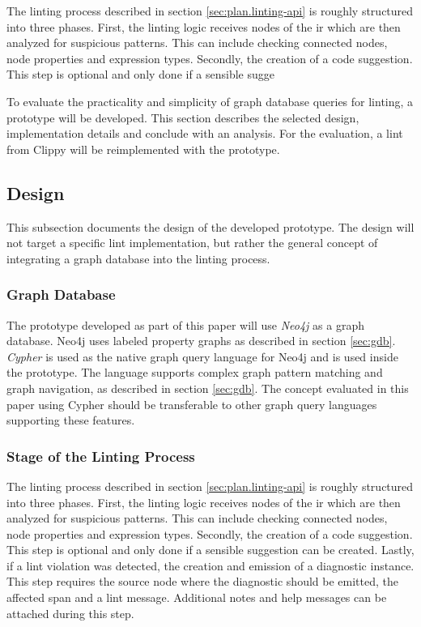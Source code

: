 The linting process described in section \ref{sec:plan.linting-api} is roughly structured into three phases. First, the linting logic receives nodes of the \acrshort{ir} which are then analyzed for suspicious patterns. This can include checking connected nodes, node properties and expression types. Secondly, the creation of a code suggestion. This step is optional and only done if a sensible sugge

To evaluate the practicality and simplicity of graph database queries for linting, a prototype will be developed. This section describes the selected design, implementation details and conclude with an analysis. For the evaluation, a lint from Clippy will be reimplemented with the prototype. 

\subsection{Design} \label{sec:prot.design}

This subsection documents the design of the developed prototype. The design will not target a specific lint implementation, but rather the general concept of integrating a graph database into the linting process.

\subsubsection{Graph Database}

The prototype developed as part of this paper will use \emph{Neo4j} as a graph database. Neo4j uses labeled property graphs as described in section \ref{sec:gdb}. \emph{Cypher} is used as the native graph query language for Neo4j and is used inside the prototype. The language supports complex graph pattern matching and graph navigation, as described in section \ref{sec:gdb}. The concept evaluated in this paper using Cypher should be transferable to other graph query languages supporting these features.

\subsubsection{Stage of the Linting Process}

The linting process described in section \ref{sec:plan.linting-api} is roughly structured into three phases. First, the linting logic receives nodes of the \acrshort{ir} which are then analyzed for suspicious patterns. This can include checking connected nodes, node properties and expression types. Secondly, the creation of a code suggestion. This step is optional and only done if a sensible suggestion can be created. Lastly, if a lint violation was detected, the creation and emission of a diagnostic instance. This step requires the source node where the diagnostic should be emitted, the affected span and a lint message. Additional notes and help messages can be attached during this step. \cite{clippy0000.addlint}

